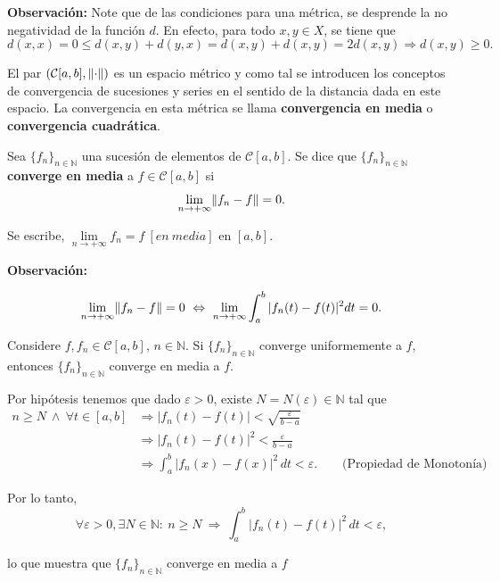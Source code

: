 \textbf{Observación:} Note que de las condiciones para una métrica, se desprende la no negatividad de la función $d$. En efecto, para todo $x,y \in X$, se tiene que
$$d(x,x) = 0 \leq d(x,y) + d(y,x) = d(x,y) + d(x,y) = 2  d(x,y) \Rightarrow d(x,y) \geq 0.$$

El par $(\mathcal{C}[a,b], \lVert\cdot\rVert)$ es un espacio métrico y como tal se introducen los conceptos de convergencia de sucesiones y series en el sentido de la distancia dada en este espacio. La convergencia en esta métrica se llama \textbf{convergencia en media} o \textbf{convergencia cuadrática}.

\begin{defi}
Sea $\{f_n\}_{n\in \mathbb{N}}$ una sucesión de elementos de $\mathcal{C}[a,b]$. Se dice que $\{f_n\}_{n\in \mathbb{N}}$ \textbf{converge en media} a $f \in \mathcal{C}[a,b]$ si 
\begin{equation*}
    \lim_{n \to + \infty} \lVert f_n - f\rVert = 0.
\end{equation*}

Se escribe, $\lim\limits_{n \to + \infty} f_n = f ~[en ~media]$ en $[a,b]$.
\end{defi}

\textbf{Observación:}
\begin{shaded}
$$ \lim_{n \to + \infty} \lVert f_n - f\rVert = 0  ~\Leftrightarrow~ \lim_{n \to + \infty} \int_a^b |f_n(t) - f(t)|^2 dt = 0.$$    
\end{shaded}

\begin{propo}
Considere $f,f_n \in \mathcal{C}[a,b]$, $n\in \mathbb{N}$. Si $\{f_n\}_{n \in \mathbb{N}}$ converge uniformemente a $f$, entonces $\{f_n\}_{n \in \mathbb{N}}$ converge en media a $f$.
\end{propo}

\begin{demo}
Por hipótesis tenemos que dado $\varepsilon > 0$, existe $N = N(\varepsilon) \in \mathbb{N}$ tal que
\begin{align*}
    n \geq N ~\wedge~ \forall t \in [a,b] &\Rightarrow |f_n(t) - f(t)| < \sqrt{\frac{\varepsilon}{b-a}} \\
    &\Rightarrow |f_n(t) - f(t)|^2 < \frac{\varepsilon}{b-a} \\
    &\Rightarrow \int_a^b |f_n(x) - f(x)|^2 \,dt < \varepsilon. \qquad \mbox{(Propiedad de Monotonía)}
\end{align*}

Por lo tanto, 
$$\forall\varepsilon > 0, \exists N \in \mathbb{N}: ~ n \geq N ~\Rightarrow~ \int_a^b |f_n(t) - f(t)|^2 \,dt < \varepsilon,$$

lo que muestra que $\{f_n\}_{n \in \mathbb{N}}$ converge en media a $f$

\end{demo}

